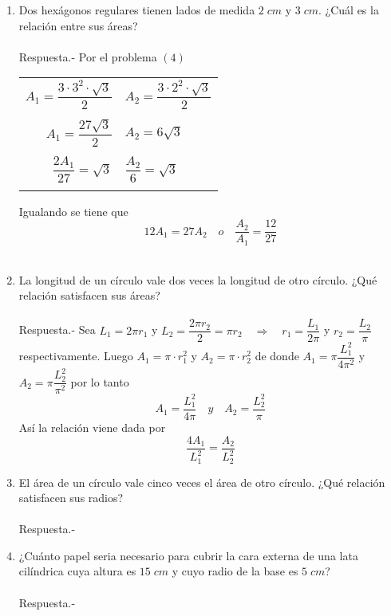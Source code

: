 \documentclass[10pt]{article}
\begin{document}
\begin{enumerate}
\item Dos hexágonos regulares tienen lados de medida $2\; cm$ y $3\; cm$. ¿Cuál es la relación entre sus áreas?\\\\
    Respuesta.-\; Por el problema $(4)$
    \begin{center}
	\begin{tabular}{r|l}
	    $A_1=\dfrac{3\cdot 3^2 \cdot \sqrt{3}}{2}$&$A_2=\dfrac{3\cdot 2^2 \cdot \sqrt{3}}{2}$\\\\
	    $A_1=\dfrac{27\sqrt{3}}{2}$&$A_2=6\sqrt{3}$\\\\
	    $\dfrac{2A_1}{27}=\sqrt{3}$&$\dfrac{A_2}{6}=\sqrt{3}$\\\\
	\end{tabular}
    \end{center}
    Igualando se tiene que $$12A_1 = 27A_2 \quad o \quad \dfrac{A_2}{A_1}=\dfrac{12}{27}$$\\

\item La longitud de un círculo vale dos veces la longitud de otro círculo. ¿Qué relación satisfacen sus áreas?\\\\
    Respuesta.-\; Sea $L_1=2\pi r_1$ \; y \; $L_2=\dfrac{2\pi r_2}{2}=\pi r_2 \quad \Longrightarrow \quad  r_1=\dfrac{L_1}{2\pi}$ \; y \; $r_2=\dfrac{L_2}{\pi}$ \; respectivamente. Luego $A_1 = \pi \cdot r_1^2$ \; y \; $A_2 =  \pi \cdot r_2^2$ \; de donde \; $A_1 = \pi \dfrac{L_1^2}{4\pi^2}$ \; y \; $A_2 = \pi \dfrac{L_2^2}{\pi^2}$ \; por lo tanto \; $$A_1 = \dfrac{L_1^2}{4\pi} \quad y \quad A_2=\dfrac{L_2^2}{\pi}$$
    Así la relación viene dada por $$\dfrac{4A_1}{L_1^2}=\dfrac{A_2}{L_2^2}$$

\item El área de un círculo vale cinco veces el área de otro círculo. ¿Qué relación satisfacen sus radios?\\\\
    Respuesta.-\;

\item ¿Cuánto papel seria necesario para cubrir la cara externa de una lata cilíndrica cuya altura es $15\; cm$ y cuyo radio de la base es $5\; cm$?\\\\
    Respuesta.-\;


\end{enumerate}
\end{document}
